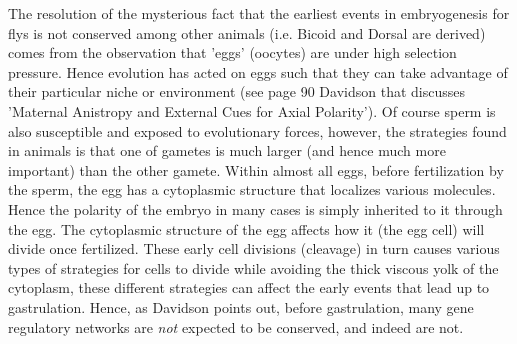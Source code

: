   The resolution of the mysterious fact that the earliest events in embryogenesis for flys is not conserved among other animals (i.e. Bicoid and Dorsal are derived) comes from the observation that 'eggs' (oocytes) are under high selection pressure.  Hence evolution has acted on eggs such that they can take advantage of their particular niche or environment (see page 90 Davidson that discusses 'Maternal Anistropy and External Cues for Axial Polarity'\cite{Davidson2006}).  Of course sperm is also susceptible and exposed to evolutionary forces, however, the strategies found in animals is that one of gametes is much larger (and hence much more important) than the other gamete.  Within almost all eggs, before fertilization by the sperm, the egg has a cytoplasmic structure that localizes various molecules.  Hence the polarity of the embryo in many cases is simply inherited to it through the egg.  The cytoplasmic structure of the egg affects how it (the egg cell) will divide once fertilized.  These early cell divisions (cleavage) in turn causes various types of strategies for cells to divide while avoiding the thick viscous yolk of the cytoplasm, these different strategies can affect the early events that lead up to gastrulation.  Hence, as Davidson points out, before gastrulation, many gene regulatory networks are \textit{not} expected to be conserved, and indeed are not.  
  
